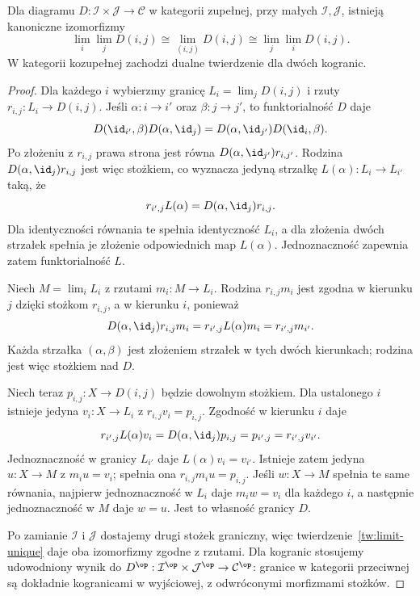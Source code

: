 \begin{twierdzenie}\label{cat:thm:iterated-limits}
Dla diagramu $D:\mathcal I\times\mathcal J\to\mathcal C$ w kategorii zupełnej, przy małych $\mathcal I,\mathcal J$, istnieją kanoniczne izomorfizmy
\[
\lim_i\lim_jD(i,j)\cong\lim_{(i,j)}D(i,j)
\cong\lim_j\lim_iD(i,j).
\]
W kategorii kozupełnej zachodzi dualne twierdzenie dla dwóch kogranic.
\end{twierdzenie}
\begin{proof}
Dla każdego $i$ wybierzmy granicę $L_i=\lim_jD(i,j)$ i rzuty $r_{i,j}:L_i\to D(i,j)$. Jeśli $\alpha:i\to i'$ oraz $\beta:j\to j'$, to funktorialność $D$ daje
\[
D(\id_{i'},\beta)D(\alpha,\id_j)
=D(\alpha,\id_{j'})D(\id_i,\beta).
\]
Po złożeniu z $r_{i,j}$ prawa strona jest równa $D(\alpha,\id_{j'})r_{i,j'}$. Rodzina $D(\alpha,\id_j)r_{i,j}$ jest więc stożkiem, co wyznacza jedyną strzałkę $L(\alpha):L_i\to L_{i'}$ taką, że
\[
r_{i',j}L(\alpha)=D(\alpha,\id_j)r_{i,j}.
\]
Dla identyczności równania te spełnia identyczność $L_i$, a dla złożenia dwóch strzałek spełnia je złożenie odpowiednich map $L(\alpha)$. Jednoznaczność zapewnia zatem funktorialność $L$.

Niech $M=\lim_iL_i$ z rzutami $m_i:M\to L_i$. Rodzina $r_{i,j}m_i$ jest zgodna w kierunku $j$ dzięki stożkom $r_{i,j}$, a w kierunku $i$, ponieważ
\[
D(\alpha,\id_j)r_{i,j}m_i
=r_{i',j}L(\alpha)m_i=r_{i',j}m_{i'}.
\]
Każda strzałka $(\alpha,\beta)$ jest złożeniem strzałek w tych dwóch kierunkach; rodzina jest więc stożkiem nad $D$.

Niech teraz $p_{i,j}:X\to D(i,j)$ będzie dowolnym stożkiem. Dla ustalonego $i$ istnieje jedyna $v_i:X\to L_i$ z $r_{i,j}v_i=p_{i,j}$. Zgodność w kierunku $i$ daje
\[
r_{i',j}L(\alpha)v_i
=D(\alpha,\id_j)p_{i,j}=p_{i',j}=r_{i',j}v_{i'}.
\]
Jednoznaczność w granicy $L_{i'}$ daje $L(\alpha)v_i=v_{i'}$. Istnieje zatem jedyna $u:X\to M$ z $m_iu=v_i$; spełnia ona $r_{i,j}m_iu=p_{i,j}$. Jeśli $w:X\to M$ spełnia te same równania, najpierw jednoznaczność w $L_i$ daje $m_iw=v_i$ dla każdego $i$, a następnie jednoznaczność w $M$ daje $w=u$. Jest to własność granicy $D$.

Po zamianie $\mathcal I$ i $\mathcal J$ dostajemy drugi stożek graniczny, więc twierdzenie~\ref{tw:limit-unique} daje oba izomorfizmy zgodne z rzutami. Dla kogranic stosujemy udowodniony wynik do $D^{\op}:\mathcal I^{\op}\times\mathcal J^{\op}\to\mathcal C^{\op}$: granice w kategorii przeciwnej są dokładnie kogranicami w wyjściowej, z odwróconymi morfizmami stożków.
\end{proof}


